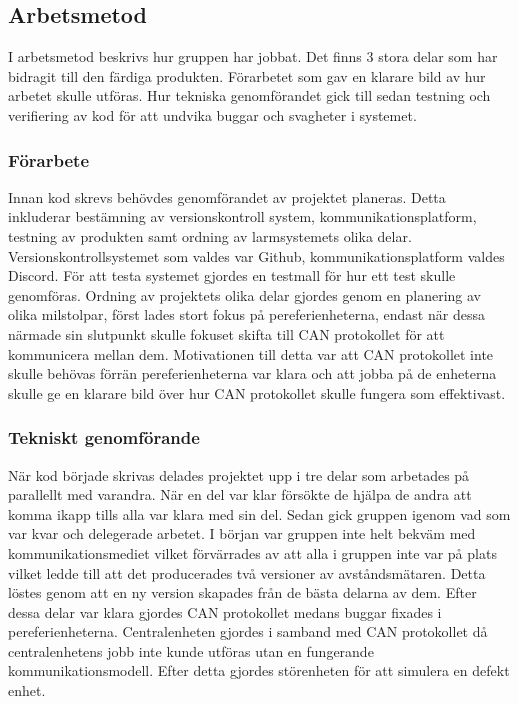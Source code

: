\documentclass{article}
\begin{document}

\subsection{Arbetsmetod}
I arbetsmetod beskrivs hur gruppen har jobbat. Det finns 3 stora delar som har bidragit till den färdiga produkten. Förarbetet som gav en klarare bild av hur arbetet skulle utföras. Hur tekniska genomförandet gick till sedan testning och verifiering av kod för att undvika buggar och svagheter i systemet.


\subsubsection{Förarbete}
Innan kod skrevs behövdes genomförandet av projektet planeras. 
Detta inkluderar bestämning av versionskontroll system, kommunikationsplatform, testning av produkten samt ordning av larmsystemets olika delar. 
Versionskontrollsystemet som valdes var Github, kommunikationsplatform valdes Discord. 
För att testa systemet gjordes en testmall för hur ett test skulle genomföras. 
Ordning av projektets olika delar gjordes genom en planering av olika milstolpar, först lades stort fokus på pereferienheterna, endast när dessa närmade sin slutpunkt skulle fokuset skifta till CAN protokollet för att kommunicera mellan dem. 
Motivationen till detta var att CAN protokollet inte skulle behövas förrän pereferienheterna var klara och att jobba på de enheterna skulle ge en klarare bild över hur CAN protokollet skulle fungera som effektivast.

\subsubsection{Tekniskt genomförande}
När kod började skrivas delades projektet upp i tre delar som arbetades på parallellt med varandra.
När en del var klar försökte de hjälpa de andra att komma ikapp tills alla var klara med sin del.
Sedan gick gruppen igenom vad som var kvar och delegerade arbetet. 
I början var gruppen inte helt bekväm med kommunikationsmediet vilket förvärrades av att alla i gruppen inte var på plats vilket ledde till att det producerades två versioner av avståndsmätaren.
Detta löstes genom att en ny version skapades från de bästa delarna av dem.
Efter dessa delar var klara gjordes CAN protokollet medans buggar fixades i pereferienheterna. Centralenheten gjordes i samband med CAN protokollet då centralenhetens jobb inte kunde utföras utan en fungerande kommunikationsmodell.
Efter detta gjordes störenheten för att simulera en defekt enhet.
\end{document}
